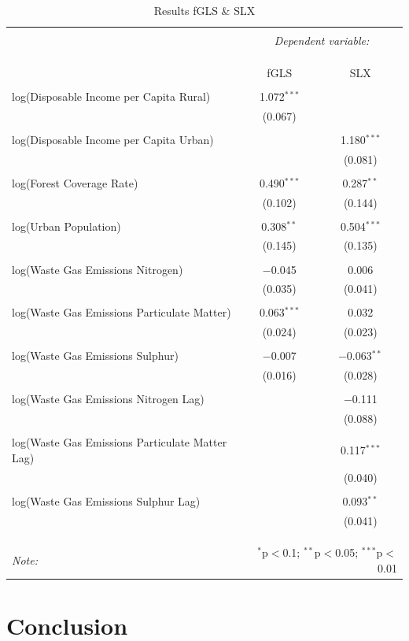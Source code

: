 \documentclass[
]{article}
\begin{document}
\begin{table}[!htbp] \centering 
	\caption{Results fGLS \& SLX} 
	\label{} 
	\begin{tabular}{@{\extracolsep{5pt}}lcc} 
		\\[-1.8ex]\hline 
		\hline \\[-1.8ex] 
		& \multicolumn{2}{c}{\textit{Dependent variable:}} \\ 
		\cline{2-3} 
		\\[-1.8ex] & \multicolumn{2}{c}{ } \\ 
		\\[-1.8ex] & fGLS & SLX\\ 
		\hline \\[-1.8ex] 
		log(Disposable Income per Capita Rural) & 1.072$^{***}$ &  \\ 
		& (0.067) &  \\ 
		& & \\ 
		log(Disposable Income per Capita Urban) &  & 1.180$^{***}$ \\ 
		&  & (0.081) \\ 
		& & \\ 
		log(Forest Coverage Rate) & 0.490$^{***}$ & 0.287$^{**}$ \\ 
		& (0.102) & (0.144) \\ 
		& & \\ 
		log(Urban Population) & 0.308$^{**}$ & 0.504$^{***}$ \\ 
		& (0.145) & (0.135) \\ 
		& & \\ 
		log(Waste Gas Emissions Nitrogen) & $-$0.045 & 0.006 \\ 
		& (0.035) & (0.041) \\ 
		& & \\ 
		log(Waste Gas Emissions Particulate Matter) & 0.063$^{***}$ & 0.032 \\ 
		& (0.024) & (0.023) \\ 
		& & \\ 
		log(Waste Gas Emissions Sulphur) & $-$0.007 & $-$0.063$^{**}$ \\ 
		& (0.016) & (0.028) \\ 
		& & \\ 
		log(Waste Gas Emissions Nitrogen Lag) &  & $-$0.111 \\ 
		&  & (0.088) \\ 
		& & \\ 
		log(Waste Gas Emissions Particulate Matter Lag) &  & 0.117$^{***}$ \\ 
		&  & (0.040) \\ 
		& & \\ 
		log(Waste Gas Emissions Sulphur Lag) &  & 0.093$^{**}$ \\ 
		&  & (0.041) \\ 
		& & \\ 
		\hline \\[-1.8ex] 
		\hline 
		\hline \\[-1.8ex] 
		\textit{Note:}  & \multicolumn{2}{r}{$^{*}$p$<$0.1; $^{**}$p$<$0.05; $^{***}$p$<$0.01} \\ 
	\end{tabular} 
\end{table} 

\section{Conclusion}
\end{document}
